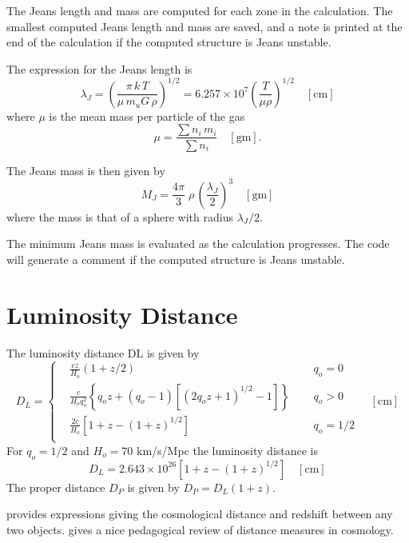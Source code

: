 The Jeans length and mass are computed for each zone in the calculation.
The smallest computed Jeans length and mass are saved, and a note is printed
at the end of the calculation if the computed structure is Jeans unstable.

The expression for the Jeans length is
\begin{equation}
{\lambda _J} = {\left( {\frac{{\pi \,k\,T}}{{\mu \,{m_u}G\,\rho }}}
\right)^{1/2}} = 6.257 \times {10^7}{\left( {\frac{T}{{\mu \rho }}}
\right)^{1/2}}
\quad [\mathrm{cm}]
\end{equation}
where $\mu$ is the mean mass per particle of the gas
\begin{equation}
\mu  = \frac{{\sum {{n_i}\,{m_i}} }}{{\sum {{n_i}} }}
\quad [\mathrm{gm}].
\end{equation}

The Jeans mass is then given by
\begin{equation}
{M_J} = \frac{{4\pi }}{3}\;\rho \,{\left( {\frac{{{\lambda _J}}}{2}}
\right)^3}
\quad [\mathrm{gm}]
\end{equation}
where the mass is that of a sphere with radius $\lambda_J /2$.

The minimum Jeans mass is evaluated as the calculation progresses.  The
code will generate a comment if the computed structure is Jeans unstable.

\section{Luminosity Distance}

The luminosity distance DL is given by
\begin{equation}
{D_L} = \left\{ \begin{array}{ccccc}
& \frac{{cz}}{{{H_o}}}\left( {1 + z/2} \right)& {q_o} = 0 \\
& \frac{c}{{{H_o}q_o^2}}\left\{ {{q_o}z + \left( {{q_o} - 1} \right)\left[
{{{\left( {2{q_o}z + 1} \right)}^{1/2}} - 1} \right]} \right\}\quad \,\,
& {q_o} > 0 \\
& \frac{{2c}}{{{H_o}}}\left[ {1 + z - {{\left( {1 + z} \right)}^{1/2}}}
\right]& {q_o} = 1/2 \\
 \end{array} \right.
\quad [\mathrm{cm}]
\end{equation}
For $q_o=1/2$ and $H_o = 70$ km/s/Mpc the luminosity distance is
\begin{equation}
{D_L} = 2.643 \times {10^{26}}\left[ {1 + z - {{\left( {1 + z}
\right)}^{1/2}}} \right]
\quad  [\mathrm{cm}]
\end{equation}
The proper distance $D_P$ is given by ${D_P} = {D_L}\left( {1 + z} \right)$.

\citet{Liske2000} provides expressions giving the cosmological distance and
redshift between any two objects.
\citet{Hogg1999} gives a nice pedagogical
review of distance measures in cosmology.

